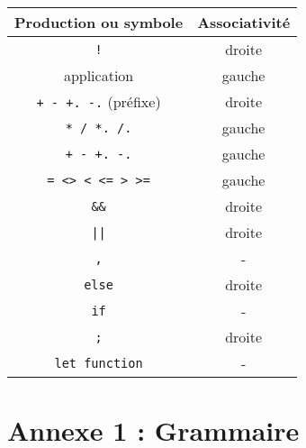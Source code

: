 \documentclass[paper=a4, fontsize=11pt]{scrartcl}
\numberwithin{equation}{section}		%
\numberwithin{figure}{section}			%
\numberwithin{table}{section}				%
\begin{document}
\begin{center}
\begin{tabular}{ | c | c | }
\hline
    \textbf{Production ou symbole}  & \textbf{Associativité} \\ \hline
    \texttt{!} 						& droite \\ 
    application						& gauche \\ 
    \texttt{+ - +. -.} (préfixe)	& droite \\ 
    \texttt{* / *. /.} 				& gauche \\ 
    \texttt{+ - +. -.}				& gauche \\ 
    \texttt{= <> < <= > >=}		    & gauche \\ 
    \texttt{\&\&}					& droite \\ 
    \texttt{||}						& droite \\ 
    \texttt{,}						& - \\ 
    \texttt{else}					& droite \\ 
    \texttt{if}						& - \\ 
    \texttt{;}						& droite \\ 
    \texttt{let function}			& - \\
\hline
\end{tabular}
\end{center}


\newpage
\section{Annexe 1 : Grammaire}
\end{document}

